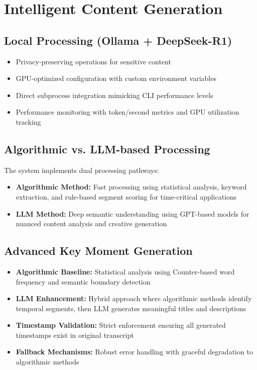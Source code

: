 \documentclass{bscs}
\begin{document}
\section{Intelligent Content Generation}

\subsection{Local Processing (Ollama + DeepSeek-R1)}

\begin{itemize}
\item Privacy-preserving operations for sensitive content
\item GPU-optimized configuration with custom environment variables
\item Direct subprocess integration mimicking CLI performance levels
\item Performance monitoring with token/second metrics and GPU utilization tracking
\end{itemize}

\subsection{Algorithmic vs. LLM-based Processing}

The system implements dual processing pathways:

\begin{itemize}
\item \textbf{Algorithmic Method:} Fast processing using statistical analysis, keyword extraction, and rule-based segment scoring for time-critical applications
\item \textbf{LLM Method:} Deep semantic understanding using GPT-based models for nuanced content analysis and creative generation
\end{itemize}

\subsection{Advanced Key Moment Generation}

\begin{itemize}
\item \textbf{Algorithmic Baseline:} Statistical analysis using Counter-based word frequency and semantic boundary detection
\item \textbf{LLM Enhancement:} Hybrid approach where algorithmic methods identify temporal segments, then LLM generates meaningful titles and descriptions
\item \textbf{Timestamp Validation:} Strict enforcement ensuring all generated timestamps exist in original transcript
\item \textbf{Fallback Mechanisms:} Robust error handling with graceful degradation to algorithmic methods
\end{itemize}
\end{document}
